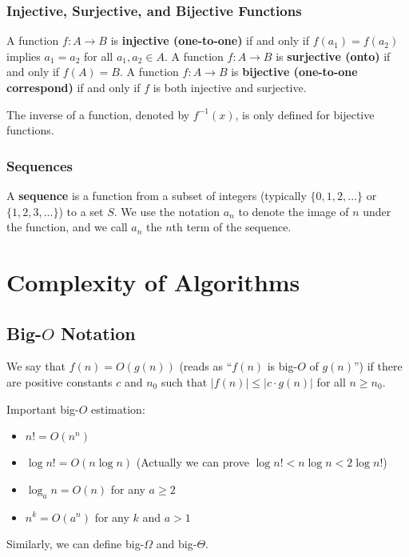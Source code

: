 \documentclass[a4paper,12pt]{article}
\begin{document}
\subsubsection{Injective, Surjective, and Bijective Functions}

A function $f: A \rightarrow B$ is \textbf{injective (one-to-one)} if and only if $f(a_1) = f(a_2)$ implies $a_1 = a_2$ for all $a_1, a_2 \in A$.
A function $f: A \rightarrow B$ is \textbf{surjective (onto)} if and only if $f(A) = B$.
A function $f: A \rightarrow B$ is \textbf{bijective (one-to-one correspond)} if and only if $f$ is both injective and surjective.

The inverse of a function, denoted by $f^{-1}(x)$, is only defined for bijective functions.

\subsubsection{Sequences}

A \textbf{sequence} is a function from a subset of integers (typically $\{0,1,2,...\}$ or $\{1,2,3,...\}$) to a set $S$.
We use the notation $a_n$ to denote the image of $n$ under the function, and we call $a_n$ the $n$th term of the sequence.

\section{Complexity of Algorithms}

\subsection{Big-$O$ Notation}

We say that $f(n) = O(g(n))$ (reads as ``$f(n)$ is big-$O$ of $g(n)$'') if there are positive constants $c$ and $n_0$ such that $|f(n)| \leq |c \cdot g(n)|$ for all $n \geq n_0$.

Important big-$O$ estimation:
\begin{itemize}
	\item $n! = O(n^n)$
	\item $\log n! = O(n \log n)$ (Actually we can prove $\log n! < n \log n < 2 \log n!$)
	\item $\log_a n = O(n)$ for any $a \geq 2$
	\item $n^k = O(a^n)$ for any $k$ and $a > 1$
\end{itemize}

Similarly, we can define big-$\Omega$ and big-$\Theta$.
\end{document}
